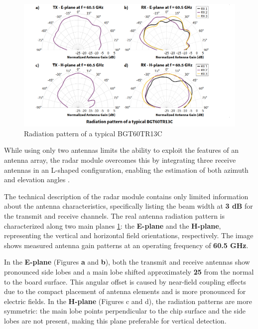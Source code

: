 \begin{figure}[H]
    \centering
    \includegraphics[width=0.9\linewidth]{Src/images/radarpattern.png}
    \caption{Radiation pattern of a typical BGT60TR13C  \citep{infineon_bgt60tr13c}}
    \label{fig:radar-patern}
\end{figure}


While using only two antennas limits the ability to exploit the features of an antenna array, the radar module overcomes this by integrating three receive antennas in an L-shaped configuration, enabling the estimation of both azimuth and elevation angles \citep{Infineon2022BGT60TR13C, Wevolver2023BGT60TR13C}.

The technical description of the radar module \citep{Infineon2022BGT60TR13C} contains only limited information about the antenna characteristics, specifically listing the beam width at \textbf{3 dB} for the transmit and receive channels. The real antenna radiation pattern is characterized along two main planes \ref{fig:radar-patern}: the \textbf{E-plane} and the \textbf{H-plane}, representing the vertical and horizontal field orientations, respectively. The image shows measured antenna gain patterns at an operating frequency of \textbf{60.5 GHz}.

In the \textbf{E-plane} (Figures \textbf{a} and \textbf{b}), both the transmit and receive antennas show pronounced side lobes and a main lobe shifted approximately \textbf{ 25 \degree } from the normal to the board surface. This angular offset is caused by near-field coupling effects due to the compact placement of antenna elements and is more pronounced for electric fields.
In the \textbf{H-plane} (Figures  c and d), the radiation patterns are more symmetric: the main lobe points perpendicular to the chip surface and the side lobes are not present, making this plane preferable for vertical detection.



